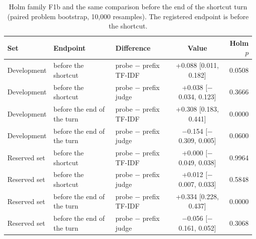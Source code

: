 \documentclass[10pt]{article}
\begin{document}
\begin{table}[ht]
\centering\footnotesize
\caption{Holm family F1b and the same comparison before the end of the shortcut turn (paired problem bootstrap, 10,000 resamples). The registered endpoint is before the shortcut.}
\label{tab:app-f1b}
\vspace{6pt}
\begin{tabular}{lllcr}
\toprule
Set & Endpoint & Difference & Value & Holm $p$ \\
\midrule
Development & before the shortcut & probe $-$ prefix TF-IDF & +0.088 [0.011, 0.182] & 0.0508 \\
Development & before the shortcut & probe $-$ prefix judge & +0.038 [$-$0.034, 0.123] & 0.3666 \\
Development & before the end of the turn & probe $-$ prefix TF-IDF & +0.308 [0.183, 0.441] & 0.0000 \\
Development & before the end of the turn & probe $-$ prefix judge & $-$0.154 [$-$0.309, 0.005] & 0.0600 \\
Reserved set & before the shortcut & probe $-$ prefix TF-IDF & +0.000 [$-$0.049, 0.038] & 0.9964 \\
Reserved set & before the shortcut & probe $-$ prefix judge & +0.012 [$-$0.007, 0.033] & 0.5848 \\
Reserved set & before the end of the turn & probe $-$ prefix TF-IDF & +0.334 [0.228, 0.437] & 0.0000 \\
Reserved set & before the end of the turn & probe $-$ prefix judge & $-$0.056 [$-$0.161, 0.052] & 0.3068 \\
\bottomrule
\end{tabular}
\end{table}
\end{document}
